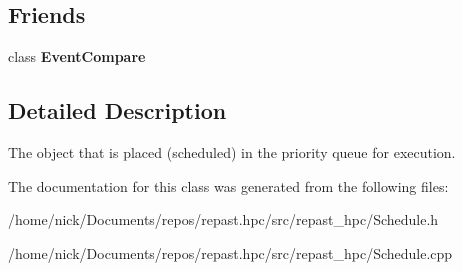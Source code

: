\subsection*{Friends}
\begin{DoxyCompactItemize}
\item 
\hypertarget{classrepast_1_1_scheduled_event_a13ca8575c9e8e7af0301158bc50424a2}{class {\bfseries Event\-Compare}}\label{classrepast_1_1_scheduled_event_a13ca8575c9e8e7af0301158bc50424a2}

\end{DoxyCompactItemize}


\subsection{Detailed Description}
The object that is placed (scheduled) in the priority queue for execution. 

The documentation for this class was generated from the following files\-:\begin{DoxyCompactItemize}
\item 
/home/nick/\-Documents/repos/repast.\-hpc/src/repast\-\_\-hpc/Schedule.\-h\item 
/home/nick/\-Documents/repos/repast.\-hpc/src/repast\-\_\-hpc/Schedule.\-cpp\end{DoxyCompactItemize}
